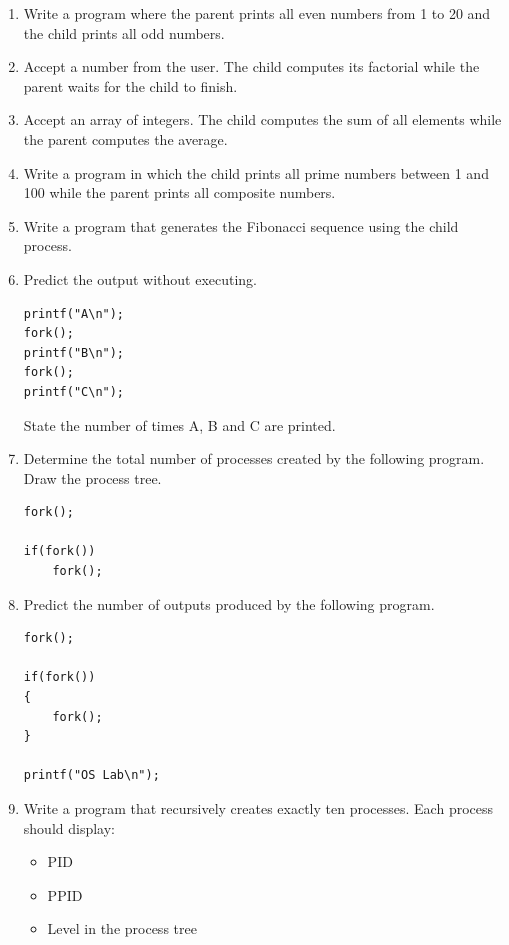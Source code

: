 \documentclass[12pt,a4paper]{article}
\begin{document}
\begin{enumerate}[resume]

\item Write a program where the parent prints all even numbers from 1 to 20 and the child prints all odd numbers.

\item Accept a number from the user. The child computes its factorial while the parent waits for the child to finish.

\item Accept an array of integers. The child computes the sum of all elements while the parent computes the average.

\item Write a program in which the child prints all prime numbers between 1 and 100 while the parent prints all composite numbers.

\item Write a program that generates the Fibonacci sequence using the child process.

\item Predict the output without executing.

\begin{lstlisting}
printf("A\n");
fork();
printf("B\n");
fork();
printf("C\n");
\end{lstlisting}

State the number of times A, B and C are printed.

\item Determine the total number of processes created by the following program. Draw the process tree.

\begin{lstlisting}
fork();

if(fork())
    fork();
\end{lstlisting}

\item Predict the number of outputs produced by the following program.

\begin{lstlisting}
fork();

if(fork())
{
    fork();
}

printf("OS Lab\n");
\end{lstlisting}

\item Write a program that recursively creates exactly ten processes. Each process should display:
\begin{itemize}
    \item PID
    \item PPID
    \item Level in the process tree
\end{itemize}


\end{enumerate}
\end{document}

